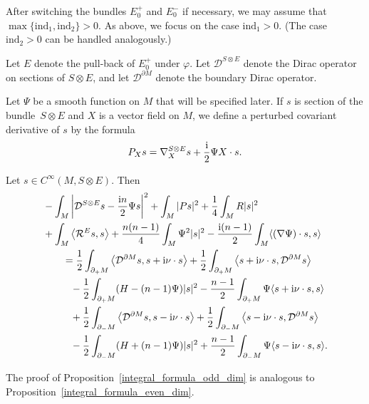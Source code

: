 After switching the bundles $E_0^+$ and $E_0^-$ if necessary, we may assume that ${\max \{\mathrm{ind}_1,\mathrm{ind}_2\} \!> 0}$.
As above, we focus on the case $\mathrm{ind}_1 > 0$.
(The case $\mathrm{ind}_2 > 0$ can be handled analogously.)

Let $E$ denote the pull-back of $E_0^+$ under $\varphi$. Let $\mathcal{D}^{S \otimes E}$ denote the Dirac operator on sections of $S \otimes E$, and let $\mathcal{D}^{\partial M}$ denote the boundary Dirac operator.

Let $\Psi$ be a smooth function on $M$ that will be specified later. If $s$ is section of the bundle~${S \otimes E}$ and $X$ is a vector field on $M$, we define a perturbed covariant derivative of $s$ by the formula
\[
 P_X s = \nabla_{X}^{S \otimes E}s + \frac{\rm i}{2} \Psi X \cdot s.
\]

\begin{Proposition}
\label{integral_formula_odd_dim}
Let $s \in C^\infty(M,S \otimes E)$.
Then
\begin{align*}
&- \int_M \left|\mathcal{D}^{S \otimes E} s - \frac{{\rm i}n}{2} \Psi s\right|^2 + \int_M |Ps|^2 + \frac{1}{4} \int_M R |s|^2 \\
&+ \int_M \big\langle \mathcal{R}^E s,s \big\rangle + \frac{n(n-1)}{4} \int_M \Psi^2 |s|^2 - \frac{{\rm i}(n-1)}{2} \int_M \langle (\nabla \Psi) \cdot s,s \rangle \\
&\qquad= \frac{1}{2} \int_{\partial_+ M} \big\langle \mathcal{D}^{\partial M} s,s + {\rm i} \nu \cdot s \big\rangle + \frac{1}{2} \int_{\partial_+ M} \big\langle s + {\rm i} \nu \cdot s,\mathcal{D}^{\partial M} s \big\rangle \\
&\phantom{\qquad=}{} - \frac{1}{2} \int_{\partial_+ M} (H-(n-1)\Psi) |s|^2 - \frac{n-1}{2} \int_{\partial_+ M} \Psi \langle s + {\rm i} \nu \cdot s,s \rangle \\
&\phantom{\qquad=}{} + \frac{1}{2} \int_{\partial_- M} \big\langle \mathcal{D}^{\partial M} s,s - {\rm i} \nu \cdot s \big\rangle + \frac{1}{2} \int_{\partial_- M} \big\langle s - {\rm i} \nu \cdot s,\mathcal{D}^{\partial M} s \big\rangle \\
&\phantom{\qquad=}{} - \frac{1}{2} \int_{\partial_- M} (H+(n-1)\Psi) |s|^2 + \frac{n-1}{2} \int_{\partial_- M} \Psi \langle s - {\rm i} \nu \cdot s,s \rangle.
\end{align*}
\end{Proposition}

The proof of Proposition~\ref{integral_formula_odd_dim} is analogous to Proposition~\ref{integral_formula_even_dim}.

